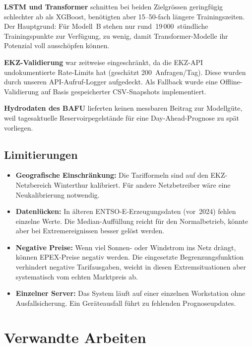 \documentclass[sigconf]{acmart}
\begin{document}
\textbf{LSTM und Transformer} schnitten bei beiden Zielgr\"ossen geringf\"ugig
schlechter ab als XGBoost, ben\"otigten aber 15--50-fach l\"angere
Trainingszeiten.
Der Hauptgrund: F\"ur Modell~B stehen nur rund~19\,000~st\"undliche
Trainingspunkte zur Verf\"ugung, zu wenig, damit Transformer-Modelle
ihr Potenzial voll aussch\"opfen k\"onnen.

\textbf{EKZ-Validierung} war zeitweise eingeschr\"ankt, da die EKZ-API
undokumentierte Rate-Limits hat (gesch\"atzt 200~Anfragen/Tag).
Diese wurden durch unseren API-Aufruf-Logger aufgedeckt.
Als Fallback wurde eine Offline-Validierung auf Basis gespeicherter
CSV-Snapshots implementiert.

\textbf{Hydrodaten des BAFU} lieferten keinen messbaren Beitrag zur
Modellg\"ute, weil tages\-aktuelle Reservoir\-pegelst\"ande f\"ur eine
Day-Ahead-Prognose zu sp\"at vorliegen.

\subsection{Limitierungen}

\begin{itemize}
  \item \textbf{Geografische Einschr\"ankung:} Die Tarifformeln sind auf den
        EKZ-Netzbereich Winterthur kalibriert. F\"ur andere Netzbetreiber
        w\"are eine Neukalibrierung notwendig.
  \item \textbf{Datenl\"ucken:} In \"alteren ENTSO-E-Erzeugungs\-daten
        (vor~2024) fehlen einzelne Werte. Die Median-Auff\"ullung reicht
        f\"ur den Normalbetrieb, k\"onnte aber bei Extremereignissen
        besser gel\"ost werden.
  \item \textbf{Negative Preise:} Wenn viel Sonnen- oder Windstrom ins Netz
        dr\"angt, k\"onnen EPEX-Preise negativ werden. Die eingesetzte
        Begrenzungs\-funktion verhindert negative Tarifausgaben, weicht in
        diesen Extremsituationen aber systematisch vom echten Marktpreis ab.
  \item \textbf{Einzelner Server:} Das System l\"auft auf einer einzelnen
        Workstation ohne Ausfallsicherung. Ein Ger\"ateausfall f\"uhrt zu
        fehlenden Prognose\-updates.
\end{itemize}

\section{Verwandte Arbeiten}
\end{document}
